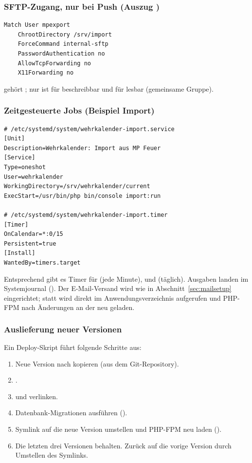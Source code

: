 \subsubsection*{SFTP-Zugang, nur bei Push (Auszug )}

\begin{lstlisting}
Match User mpexport
    ChrootDirectory /srv/import
    ForceCommand internal-sftp
    PasswordAuthentication no
    AllowTcpForwarding no
    X11Forwarding no
\end{lstlisting}

 gehört ; nur  ist für
 beschreibbar und für  lesbar (gemeinsame
Gruppe).

\subsubsection*{Zeitgesteuerte Jobs (Beispiel Import)}

\begin{lstlisting}
# /etc/systemd/system/wehrkalender-import.service
[Unit]
Description=Wehrkalender: Import aus MP Feuer
[Service]
Type=oneshot
User=wehrkalender
WorkingDirectory=/srv/wehrkalender/current
ExecStart=/usr/bin/php bin/console import:run

# /etc/systemd/system/wehrkalender-import.timer
[Timer]
OnCalendar=*:0/15
Persistent=true
[Install]
WantedBy=timers.target
\end{lstlisting}

Entsprechend gibt es Timer für  (jede Minute),
 und  (täglich). Ausgaben landen im
Systemjournal (). Der E-Mail-Versand
wird wie in Abschnitt~\ref{sec:mailsetup} eingerichtet; statt
 wird 
direkt im Anwendungsverzeichnis aufgerufen und PHP-FPM nach Änderungen an
der  neu geladen.

\subsubsection*{Auslieferung neuer Versionen}

Ein Deploy-Skript führt folgende Schritte aus:

\begin{enumerate}
  \item Neue Version nach  kopieren (aus dem
        Git-Repository).
  \item {}.
  \item {} und  verlinken.
  \item Datenbank-Migrationen ausführen
        ().
  \item Symlink  auf die neue Version umstellen und
        PHP-FPM neu laden ().
  \item Die letzten drei Versionen behalten. Zurück auf die vorige Version
        durch Umstellen des Symlinks.
\end{enumerate}

